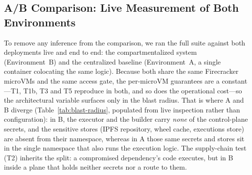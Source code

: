 
\subsection{A/B Comparison: Live Measurement of Both Environments}
\label{sec:ab-results}

To remove any inference from the comparison, we ran the full suite against both deployments
live and end to end: the compartmentalized system (Environment~B) and the centralized
baseline (Environment~A, a single container colocating the same logic). Because both share
the same Firecracker microVMs and the same access gate, the per-microVM guarantees are a
constant---T1, T1b, T3 and T5 reproduce in both, and so does the operational cost---so the
architectural variable surfaces only in the blast radius. That is where A and B diverge
(Table~\ref{tab:blast-radius}, populated from live inspection rather than configuration):
in B, the executor and the builder carry \emph{none} of the control-plane secrets, and the
sensitive stores (IPFS repository, wheel cache, executions store) are absent from their
namespace, whereas in A those same secrets and stores sit in the single namespace that also
runs the execution logic. The supply-chain test (T2) inherits the split: a compromised
dependency's code executes, but in B inside a plane that holds neither secrets nor a route
to them.

